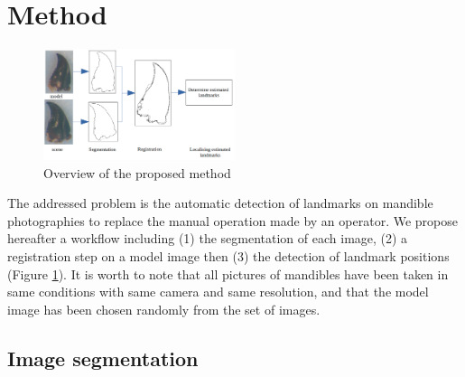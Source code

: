 \documentclass[twoside,twocolumn,10pt]{article}
\begin{document}
\section{Method}

\begin{figure}[htb]
    \centering
    \includegraphics[width=0.5\textwidth]{./images/method}
    \caption{Overview of the proposed method}
    \label{fig:method}
\end{figure}
The addressed problem is the automatic detection of landmarks on
mandible photographies to replace the manual operation made by an operator.
We propose hereafter a workflow including (1) the segmentation of each
image, (2) a registration step on a model image then (3) the detection
of landmark positions (Figure \ref{fig:method}). It is worth to note
that all pictures of mandibles have been taken
in same conditions with same camera and same resolution, and that
the model image has been chosen randomly from the set of images.


\subsection{Image segmentation}
\end{document}
